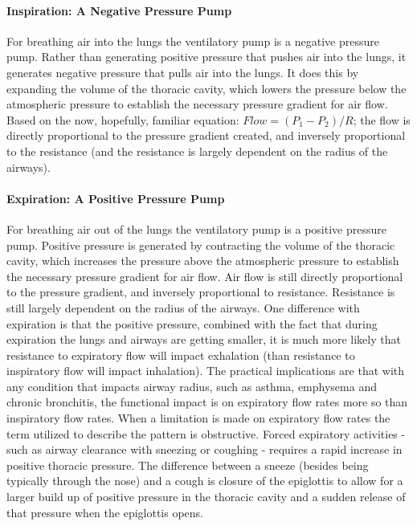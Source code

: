 \paragraph{Inspiration: A Negative Pressure Pump} For breathing air into the lungs the ventilatory pump is a negative pressure pump. Rather than generating positive pressure that pushes air into the lungs, it generates negative pressure that pulls air into the lungs. It does this by expanding the volume of the thoracic cavity, which lowers the pressure below the atmospheric pressure to establish the necessary pressure gradient for air flow. Based on the now, hopefully, familiar equation: $Flow = (P_1 - P_2) / R$; the flow is directly proportional to the pressure gradient created, and inversely proportional to the resistance (and the resistance is largely dependent on the radius of the airways). 

\paragraph{Expiration: A Positive Pressure Pump} For breathing air out of the lungs the ventilatory pump is a positive pressure pump. Positive pressure is generated by contracting the volume of the thoracic cavity, which increases the pressure above the atmospheric pressure to establish the necessary pressure gradient for air flow. Air flow is still directly proportional to the pressure gradient, and inversely proportional to resistance. Resistance is still largely dependent on the radius of the airways. 
One difference with expiration is that the positive pressure, combined with the fact that during expiration the lungs and airways are getting smaller, it is much more likely that resistance to expiratory flow will impact exhalation (than resistance to inspiratory flow will impact inhalation). The practical implications are that with any condition that impacts airway radius, such as asthma, emphysema and chronic bronchitis, the functional impact is on expiratory flow rates more so than inspiratory flow rates. When a limitation is made on expiratory flow rates the term utilized to describe the pattern is obstructive. 
Forced expiratory activities - such as airway clearance with sneezing or coughing - requires a rapid increase in positive thoracic pressure. The difference between a sneeze (besides being typically through the nose) and a cough is closure of the epiglottis to allow for a larger build up of positive pressure in the thoracic cavity and a sudden release of that pressure when the epiglottis opens.  

